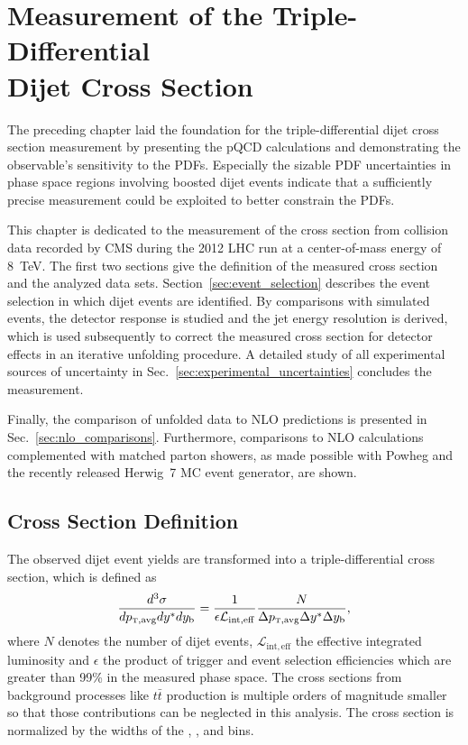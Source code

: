 
\chapter[Measurement of the Triple-Differential Dijet Cross Section]{Measurement
of the Triple-Differential\\ Dijet Cross Section}
\label{sec:measurement}

The preceding chapter laid the foundation for the triple-differential dijet
cross section measurement by presenting the pQCD calculations and
demonstrating the observable's sensitivity to the PDFs. Especially the sizable
PDF uncertainties in phase space regions involving boosted dijet events indicate
that a sufficiently precise measurement could be exploited to better constrain
the PDFs. 

This chapter is dedicated to the measurement of the cross section from collision
data recorded by CMS during the 2012 LHC run at a center-of-mass energy of
\SI{8}{\TeV}. The first two sections give the definition of the measured cross
section and the analyzed data sets. Section~\ref{sec:event_selection} describes the
event selection in which dijet events are identified. By comparisons with simulated
events, the detector response is studied and the jet energy resolution is
derived, which is used subsequently to correct the measured cross section for detector
effects in an iterative unfolding procedure. A detailed study of all
experimental sources of uncertainty in Sec.~\ref{sec:experimental_uncertainties}
concludes the measurement.

Finally, the comparison of unfolded data to NLO predictions is presented in
Sec.~\ref{sec:nlo_comparisons}. Furthermore, comparisons to NLO calculations
complemented with matched parton showers, as made possible with Powheg and the
recently released Herwig~7 MC event generator, are shown.

\section{Cross Section Definition}

The observed dijet event yields are transformed into a triple-differential
cross section, which is defined as
%
\begin{equation*}
    \frac{d^3 \sigma}{d \ptavg d \ystar d \yboost} = \frac{1}{\epsilon
        \mathcal{L}_{\mathrm{int, eff}}} \frac{N}{\Delta \ptavg \Delta \ystar
        \Delta \yboost},
\end{equation*}
%
where $N$ denotes the number of dijet events, $\mathcal{L}_{\mathrm{int, eff}}$
the effective integrated luminosity and $\epsilon$ the product of trigger and
event selection efficiencies which are greater than 99\% in the measured phase
space. The cross sections from background processes like $t\bar t$ production is
multiple orders of magnitude smaller so that those contributions can be
neglected in this analysis. The cross section is normalized by the widths of
the \ptavg, \ystar, and \yboost bins. 

